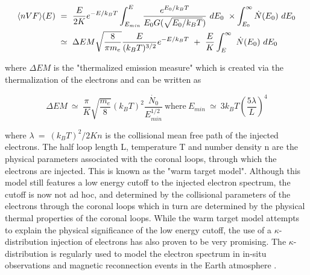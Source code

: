 \begin{align}
    \langle nVF\rangle(E)~&=~\frac{E}{2K}e^{-E/k_{B}T}\int_{E_{min}}^{E}\frac{e^{E_0/k_{B}T}}{E_0G(\sqrt{E_0/k_{B}T})}~dE_0~\times \int_{E_0}^{\infty} \dot{N}(E_0)~dE_0 \notag \\
    &\simeq~\Delta EM\sqrt{\frac{8}{\pi m_e}}\frac{E}{(k_B T)^{3/2}}e^{-E/k_B T}~+~\frac{E}{K}\int_{E}^{\infty}~\dot{N}(E_0)~dE_0
\end{align}

\noindent where $\Delta EM$ is the "thermalized emission measure" which is created via the thermalization of the electrons and can be written as

\begin{equation}
    \Delta EM~\simeq~\frac{\pi}{K}\sqrt{\frac{m_e}{8}}(k_B T)^{2}\frac{\dot{N_0}}{E_{min}^{1/2}}~\mathrm{where}~E_{min}~\simeq~3k_B T\left( \frac{5\lambda}{L} \right)^4
\end{equation}

\noindent where $\lambda~=~(k_B T)^{2}/2Kn$ is the collisional mean free path of the injected electrons. The half loop length L, temperature T and number density n are the physical parameters associated with the coronal loops, through which the electrons are injected. This is known as the "warm target model". Although this model still features a low energy cutoff to the injected electron spectrum, the cutoff is now not ad hoc, and determined by the collisional parameters of the electrons through the coronal loops which in turn are determined by the physical thermal properties of the coronal loops. While the warm target model attempts to explain the physical significance of the low energy cutoff, the use of a $\kappa$-distribution injection of electrons has also proven to be very promising. The $\kappa$-distribution is regularly used to model the electron spectrum in in-situ observations and magnetic reconnection events in the Earth atmosphere \citep{maksimovic05, imada11}.

